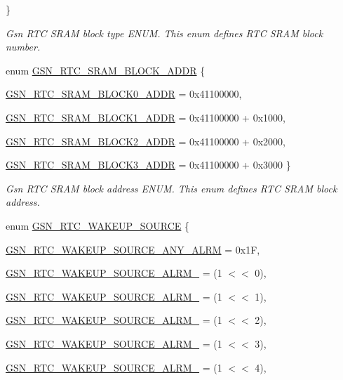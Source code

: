 \begin{DoxyCompactItemize}
 \}
\begin{DoxyCompactList}\small\item\em Gsn RTC SRAM block type ENUM. This enum defines RTC SRAM block number. \end{DoxyCompactList}\item 
enum \hyperlink{a00651_gaec3839be6e64287f1c0981aafc08548b}{GSN\_\-RTC\_\-SRAM\_\-BLOCK\_\-ADDR} \{ \par
\hyperlink{a00651_ggaec3839be6e64287f1c0981aafc08548ba9645b34f89a1114967cc3273b138e76a}{GSN\_\-RTC\_\-SRAM\_\-BLOCK0\_\-ADDR} =  0x41100000, 
\par
\hyperlink{a00651_ggaec3839be6e64287f1c0981aafc08548ba0e2e7ff5dcf4d136ec56d8cd92e3c920}{GSN\_\-RTC\_\-SRAM\_\-BLOCK1\_\-ADDR} =  0x41100000 + 0x1000, 
\par
\hyperlink{a00651_ggaec3839be6e64287f1c0981aafc08548ba42da0e4e8aaee1e47cc8a6500816ee3b}{GSN\_\-RTC\_\-SRAM\_\-BLOCK2\_\-ADDR} =  0x41100000 + 0x2000, 
\par
\hyperlink{a00651_ggaec3839be6e64287f1c0981aafc08548ba6a983ff757cfc02c7840260c15197f91}{GSN\_\-RTC\_\-SRAM\_\-BLOCK3\_\-ADDR} =  0x41100000 + 0x3000
 \}
\begin{DoxyCompactList}\small\item\em Gsn RTC SRAM block address ENUM. This enum defines RTC SRAM block address. \end{DoxyCompactList}\item 
enum \hyperlink{a00651_gae287d9e78906e2c47d820fbde51a862e}{GSN\_\-RTC\_\-WAKEUP\_\-SOURCE} \{ \par
\hyperlink{a00651_ggae287d9e78906e2c47d820fbde51a862eafcbc2880dd529fe46dcbf1d7869ad389}{GSN\_\-RTC\_\-WAKEUP\_\-SOURCE\_\-ANY\_\-ALRM} =  0x1F, 
\par
\hyperlink{a00651_ggae287d9e78906e2c47d820fbde51a862ea693f6f3681d8eaf9cac688c9ba3e2d21}{GSN\_\-RTC\_\-WAKEUP\_\-SOURCE\_\-ALRM\_} =  (1 $<$$<$ 0), 
\par
\hyperlink{a00651_ggae287d9e78906e2c47d820fbde51a862eaade77c053e65f4fd35cb3df984d09c86}{GSN\_\-RTC\_\-WAKEUP\_\-SOURCE\_\-ALRM\_} =  (1 $<$$<$ 1), 
\par
\hyperlink{a00651_ggae287d9e78906e2c47d820fbde51a862ea62248bb900330f84d559f46e186eca45}{GSN\_\-RTC\_\-WAKEUP\_\-SOURCE\_\-ALRM\_} =  (1 $<$$<$ 2), 
\par
\hyperlink{a00651_ggae287d9e78906e2c47d820fbde51a862ea61615cc6fccf9780e9bc48cbd1e83a0b}{GSN\_\-RTC\_\-WAKEUP\_\-SOURCE\_\-ALRM\_} =  (1 $<$$<$ 3), 
\par
\hyperlink{a00651_ggae287d9e78906e2c47d820fbde51a862eabba5a79a5565593894719cc5bb2aa51e}{GSN\_\-RTC\_\-WAKEUP\_\-SOURCE\_\-ALRM\_} =  (1 $<$$<$ 4), 
$$
\end{DoxyCompactItemize}
